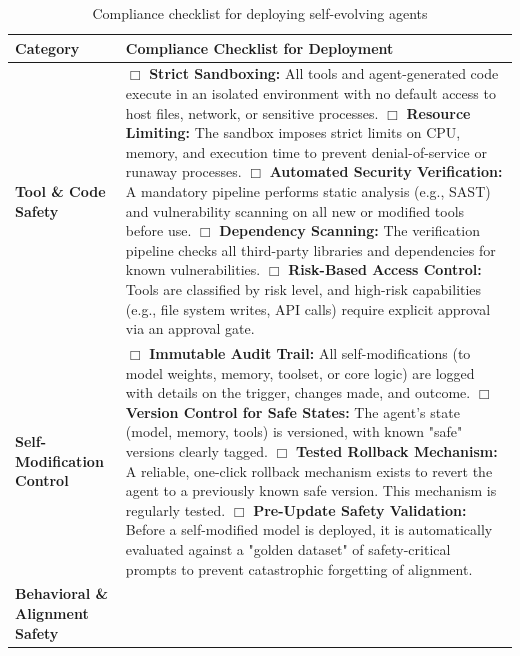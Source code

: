 \documentclass[10pt]{article} %
\begin{document}
\begin{table}[h!]
\renewcommand{\arraystretch}{1.2}
\centering
\caption{Compliance checklist for deploying self-evolving agents}
\label{tab:minimal_compliance_checklist}
\small
\begin{tabularx}{\textwidth}{|>{\raggedright\arraybackslash}p{3cm}|X|}
\hline
\textbf{Category} & \textbf{Compliance Checklist for Deployment}\\ \hline
\textbf{Tool \& Code Safety}
    & $\Box$ \textbf{Strict Sandboxing:} All tools and agent-generated code execute in an isolated environment with no default access to host files, network, or sensitive processes. \newline
    $\Box$ \textbf{Resource Limiting:} The sandbox imposes strict limits on CPU, memory, and execution time to prevent denial-of-service or runaway processes. \newline
    $\Box$ \textbf{Automated Security Verification:} A mandatory pipeline performs static analysis (e.g., SAST) and vulnerability scanning on all new or modified tools before use. \newline
    $\Box$ \textbf{Dependency Scanning:} The verification pipeline checks all third-party libraries and dependencies for known vulnerabilities. \newline
    $\Box$ \textbf{Risk-Based Access Control:} Tools are classified by risk level, and high-risk capabilities (e.g., file system writes, API calls) require explicit approval via an approval gate. \\ \hline
\textbf{Self-Modification Control}
    & $\Box$ \textbf{Immutable Audit Trail:} All self-modifications (to model weights, memory, toolset, or core logic) are logged with details on the trigger, changes made, and outcome. \newline
    $\Box$ \textbf{Version Control for Safe States:} The agent's state (model, memory, tools) is versioned, with known "safe" versions clearly tagged. \newline
    $\Box$ \textbf{Tested Rollback Mechanism:} A reliable, one-click rollback mechanism exists to revert the agent to a previously known safe version. This mechanism is regularly tested. \newline
    $\Box$ \textbf{Pre-Update Safety Validation:} Before a self-modified model is deployed, it is automatically evaluated against a "golden dataset" of safety-critical prompts to prevent catastrophic forgetting of alignment. \\ \hline
\textbf{Behavioral \& Alignment Safety}

\end{tabularx}
\end{table}
\end{document}
